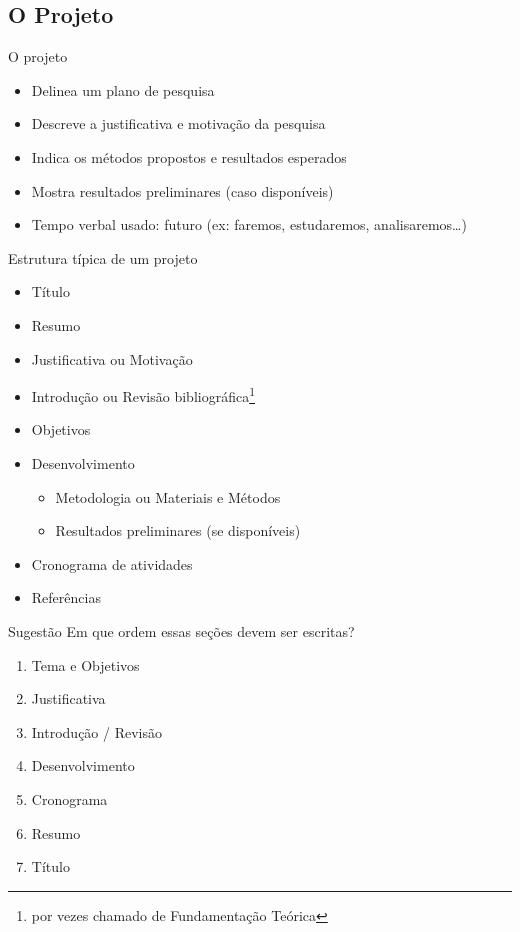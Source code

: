\documentclass{beamer}
\begin{document}
\subsection{O Projeto}

\begin{frame}{O projeto}
  \begin{itemize}
  \item Delinea um \alert{plano} de pesquisa
  \item Descreve a justificativa e motivação da pesquisa
  \item Indica os métodos propostos e resultados esperados
  \item Mostra resultados preliminares (caso disponíveis)
  \item Tempo verbal usado: \alert{futuro} (ex: faremos, estudaremos,
    analisaremos\ldots)
  \end{itemize}
\end{frame}

\begin{frame}{Estrutura típica de um projeto}
  \begin{itemize}
  \item Título
  \item Resumo
  \item Justificativa ou Motivação
  \item Introdução ou Revisão bibliográfica\footnote{por vezes chamado
      de Fundamentação Teórica}
  \item Objetivos
  \item Desenvolvimento
    \begin{itemize}
    \item Metodologia ou Materiais e Métodos
    \item Resultados preliminares (se disponíveis)
    \end{itemize}
  \item Cronograma de atividades
  \item Referências
  \end{itemize}
\end{frame}

\begin{frame}{Sugestão}
Em que ordem essas seções devem ser escritas?
\begin{enumerate}
\item Tema e Objetivos
\item Justificativa
\item Introdução / Revisão
\item Desenvolvimento
\item Cronograma
\item Resumo
\item Título
\end{enumerate}
\end{frame}
\end{document}
